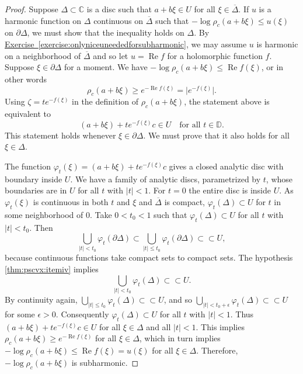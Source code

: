 \documentclass[12pt,openany]{book}
\renewcommand{\Re}{\operatorname{Re}}
\newcommand{\sabs}[1]{\lvert {#1} \rvert}
\newcommand{\babs}[1]{\bigl\lvert {#1} \bigr\rvert}
\newcommand{\C}{{\mathbb{C}}}
\newcommand{\D}{{\mathbb{D}}}
\theoremstyle{plain}
\theoremstyle{remark}
\theoremstyle{definition}
\theoremstyle{exercise}
\theoremstyle{example}
\newcommand{\exerciseref}[1]{\hyperref[#1]{Exercise~\ref*{#1}}}
\begin{document}
\begin{proof}
Suppose $\Delta \subset \C$ is a disc such that
$a+b\xi \in U$
for all $\xi \in
\overline{\Delta}$.
If $u$ is a harmonic function on $\Delta$ continuous on $\overline{\Delta}$
such that
$- \log \rho_c(a+b\xi) \leq u(\xi)$ on $\partial \Delta$, we must
show that the inequality holds on $\Delta$.
By \exerciseref{exercise:onlyniceuneededforsubharmonic},
we may assume $u$ is harmonic on a neighborhood of $\overline{\Delta}$
and so let $u = \Re f$ for a holomorphic function $f$.
Suppose $\xi \in \partial \Delta$ for a moment.
We have  $- \log \rho_c(a+b\xi) \leq \Re
f(\xi)$,
or in other words
\begin{equation*}
\rho_c(a+b\xi) \geq e^{-\Re f(\xi)} = \babs{e^{-f(\xi)}}.
\end{equation*}
Using $\zeta = t e^{-f(\xi)}$ in the definition of $\rho_c(a+b\xi)$, the
statement above is equivalent
to
\begin{equation*}
(a+b\xi)+te^{-f(\xi)}c \in U \quad \text{for all $t \in \D$}.
\end{equation*}
This statement holds whenever $\xi \in \partial \Delta$.  We must prove that
it also holds for all $\xi \in \Delta$.

The function $\varphi_t(\xi) =
(a+b\xi)+te^{-f(\xi)}c$ gives a closed analytic disc with boundary inside
$U$.  We have a family of analytic discs, parametrized by $t$, whose boundaries are in
$U$ for all $t$ with $\sabs{t} < 1$.  For $t=0$ the entire disc is
inside $U$.  As $\varphi_t(\xi)$ is continuous in both $t$ and $\xi$ and
$\overline{\Delta}$ is compact,
$\varphi_t(\Delta) \subset U$ for $t$ in some neighborhood of $0$.
Take $0 < t_0 < 1$ such that
$\varphi_t(\Delta) \subset U$ for all $t$ with $\sabs{t} < t_0$.
Then
\begin{equation*}
\bigcup_{\sabs{t} < t_0} \varphi_t(\partial \Delta)
\subset
\bigcup_{\sabs{t} \leq t_0} \varphi_t(\partial \Delta)
\subset \subset U ,
\end{equation*}
because continuous functions take compact sets to compact sets.
The hypothesis \ref{thm:pscvx:itemiv} implies
\begin{equation*}
\bigcup_{\sabs{t} < t_0} \varphi_t(\Delta)
\subset \subset U  .
\end{equation*}
By continuity again,
$\bigcup_{\sabs{t} \leq t_0} \varphi_t(\Delta)
\subset \subset U$, and so
$\bigcup_{\sabs{t} < t_0+\epsilon} \varphi_t(\Delta)
\subset \subset U$
for some $\epsilon > 0$.
Consequently $\varphi_t(\Delta) \subset U$
for all $t$ with $\sabs{t} < 1$.  Thus
$(a+b\xi)+te^{-f(\xi)}c \in U$ for all $\xi \in \Delta$ and all $\sabs{t} <
1$.  This implies $\rho_c(a+b\xi) \geq e^{-\Re f(\xi)}$ for all $\xi \in
\Delta$, which in
turn implies $-\log \rho_c(a+b\xi) \leq \Re f(\xi) = u(\xi)$ for all $\xi
\in \Delta$.
Therefore, $-\log \rho_c(a+b\xi)$ is subharmonic.
\end{proof}
\end{document}
